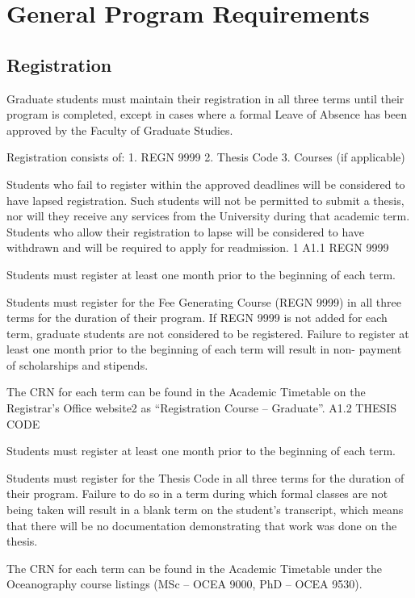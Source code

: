 \documentclass{article}
\begin{document}
\section{General Program Requirements}

\subsection{Registration}

Graduate students must maintain their registration in all three terms until
their program is completed, except in cases where a formal Leave of Absence has
been approved by the Faculty of Graduate Studies.

Registration consists of:
1.	REGN 9999
2.	Thesis Code
3.	Courses (if applicable)

Students who fail to register within the approved deadlines will be considered to have lapsed registration. Such students will not be permitted to submit a thesis, nor will they receive any services from the University during that academic term. Students who allow their registration to lapse will be considered to have withdrawn and will be required to apply for readmission. 1
A1.1	REGN 9999

Students must register at least one month prior to the beginning of each term.

Students must register for the Fee Generating Course (REGN 9999) in all three terms for the duration of their program. If REGN 9999 is not added for each term, graduate students are not considered to be registered. Failure to register at least one month prior to the beginning of each term will result in non- payment of scholarships and stipends.

The CRN for each term can be found in the Academic Timetable on the Registrar’s Office website2 as “Registration Course – Graduate”.
A1.2	THESIS CODE

Students must register at least one month prior to the beginning of each term.

Students must register for the Thesis Code in all three terms for the duration of their program. Failure to do so in a term during which formal classes are not being taken will result in a blank term on the student’s transcript, which means that there will be no documentation demonstrating that work was done on the thesis.

The CRN for each term can be found in the Academic Timetable under the Oceanography course listings (MSc – OCEA 9000, PhD – OCEA 9530).
\end{document}
